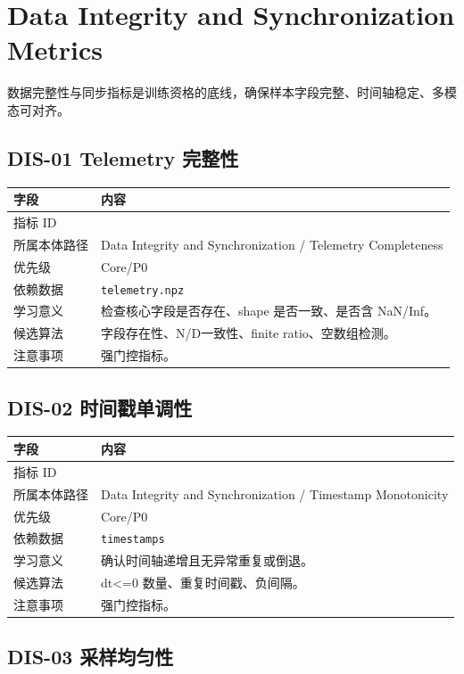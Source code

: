 \documentclass[UTF8,zihao=-4,oneside,openany]{ctexrep}
\newcommand{\Code}[1]{\texttt{#1}}
\newcommand{\MID}[1]{\texttt{\seqsplit{#1}}}
\begin{document}
\section{Data Integrity and Synchronization Metrics}

数据完整性与同步指标是训练资格的底线，确保样本字段完整、时间轴稳定、多模态可对齐。


\subsection{DIS-01 Telemetry 完整性}

\begin{longtable}{L{3.6cm} L{9.6cm}}
\toprule
字段 & 内容 \\
\midrule
指标 ID & \MID{DIS-01} \\
所属本体路径 & Data Integrity and Synchronization / Telemetry Completeness \\
优先级 & Core/P0 \\
依赖数据 & \Code{telemetry.npz} \\
学习意义 & 检查核心字段是否存在、shape 是否一致、是否含 NaN/Inf。 \\
候选算法 & 字段存在性、N/D一致性、finite ratio、空数组检测。 \\
注意事项 & 强门控指标。 \\
\bottomrule
\end{longtable}

\subsection{DIS-02 时间戳单调性}

\begin{longtable}{L{3.6cm} L{9.6cm}}
\toprule
字段 & 内容 \\
\midrule
指标 ID & \MID{DIS-02} \\
所属本体路径 & Data Integrity and Synchronization / Timestamp Monotonicity \\
优先级 & Core/P0 \\
依赖数据 & \Code{timestamps} \\
学习意义 & 确认时间轴递增且无异常重复或倒退。 \\
候选算法 & dt<=0 数量、重复时间戳、负间隔。 \\
注意事项 & 强门控指标。 \\
\bottomrule
\end{longtable}

\subsection{DIS-03 采样均匀性}
\end{document}
